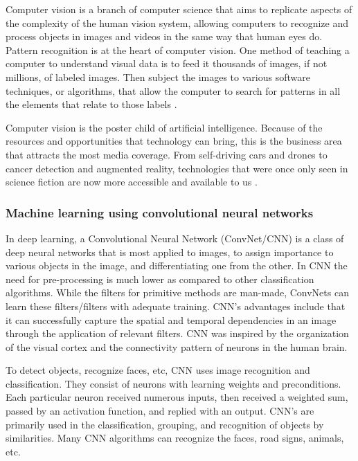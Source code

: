 Computer vision is a branch of computer science that aims to replicate aspects of the complexity of the human vision system, allowing computers to recognize and process objects in images and videos in the same way that human eyes do. Pattern recognition is at the heart of computer vision. One method of teaching a computer to understand visual data is to feed it thousands of images, if not millions, of labeled images. Then subject the images to various software techniques, or algorithms, that allow the computer to search for patterns in all the elements that relate to those labels \cite{mihajlovic_everything_2019}.

Computer vision is the poster child of artificial intelligence. Because of the resources and opportunities that technology can bring, this is the business area that attracts the most media coverage. From self-driving cars and drones to cancer detection and augmented reality, technologies that were once only seen in science fiction are now more accessible and available to us \cite{ambalina_5_2020}.



\subsubsection*{Machine learning using convolutional neural networks}
In deep learning, a Convolutional Neural Network (ConvNet/CNN) is a class of deep neural networks that is most applied to images, to assign importance to various objects in the image, and differentiating one from the other. In CNN the need for pre-processing is much lower as compared to other classification algorithms. While the filters for primitive methods are man-made, ConvNets can learn these filters/filters with adequate training. CNN's advantages include that it can successfully capture the spatial and temporal dependencies in an image through the application of relevant filters. CNN was inspired by the organization of the visual cortex and the connectivity pattern of neurons in the human brain\cite{saha_comprehensive_2018}. 

To detect objects, recognize faces, etc, CNN uses image recognition and classification. They consist of neurons with learning weights and preconditions. Each particular neuron received numerous inputs, then received a weighted sum, passed by an activation function, and replied with an output. CNN's are primarily used in the classification, grouping, and recognition of objects by similarities. Many CNN algorithms can recognize the faces, road signs, animals, etc\cite{bansari_introduction_2019}.

